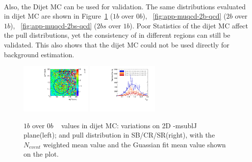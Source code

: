 \paragraph{}
Also, the Dijet MC can be used for validation. 
The same distributions evaluated in dijet MC are shown in Figure~\ref{fig:app-muqcd-1b-qcd} ($1b$ over $0b$), ~\ref{fig:app-muqcd-2b-qcd} ($2b$ over $1b$), ~\ref{fig:app-muqcd-2bs-qcd} ($2bs$ over $1b$).  
Poor Statistics of the dijet MC affect the pull distributions, yet the consistency of \muqcd in different regions can still be validated.
This also shows that the dijet MC could not be used directly for background estimation.


\begin{figure}[htbp!]
\begin{center}
\includegraphics[width=0.31\textwidth,angle=-90]{figures/boosted/AppendixMuqcdstudy/QCD_OneTag_Incl_mH0H1.pdf}
\includegraphics[width=0.31\textwidth,angle=-90]{figures/boosted/AppendixMuqcdstudy/QCD_OneTag_Incl_mH0H1_pull.pdf}
\caption{$1b$ over 0$b$ \muqcd~ values in dijet MC: \muqcd variations on 2D \mleadJ-msublJ plane(left); and \muqcd pull distribution in SB/CR/SR(right), with the $N_{event}$ weighted mean value and the Guassian fit mean value shown on the plot.}
\label{fig:app-muqcd-1b-qcd}
\end{center}
\end{figure}

